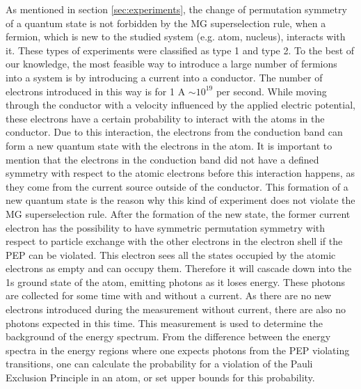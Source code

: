 
As mentioned in section \ref{sec:experiments}, the change of permutation symmetry of a quantum state is not forbidden by the MG superselection rule, when a fermion, which is new to the studied system (e.g. atom, nucleus), interacts with it. These types of experiments were classified as type 1 and type 2. To the best of our knowledge, the most feasible way to introduce a large number of fermions into a system is by introducing a current into a conductor. The number of electrons introduced in this way is for 1 A $\sim 10^{19}$ per second. While moving through the conductor with a velocity influenced by the applied electric potential, these electrons have a certain probability to interact with the atoms in the conductor. Due to this interaction, the electrons from the conduction band can form a new quantum state with the electrons in the atom. It is important to mention that the electrons in the conduction band did not have a defined symmetry with respect to the atomic electrons before this interaction happens, as they come from the current source outside of the conductor. This formation of a new quantum state is the reason why this kind of experiment does not violate the MG superselection rule. After the formation of the new state, the former current electron has the possibility to have symmetric permutation symmetry with respect to particle exchange with the other electrons in the electron shell if the PEP can be violated. This electron sees all the states occupied by the atomic electrons as empty and can occupy them. Therefore it will cascade down into the 1s ground state of the atom, emitting photons as it loses energy. These photons are collected for some time with and without a current. As there are no new electrons introduced during the measurement without current, there are also no photons expected in this time. This measurement is used to determine the background of the energy spectrum. From the difference between the energy spectra in the energy regions where one expects photons from the PEP violating transitions, one can calculate the probability for a violation of the Pauli Exclusion Principle in an atom, or set upper bounds for this probability.

